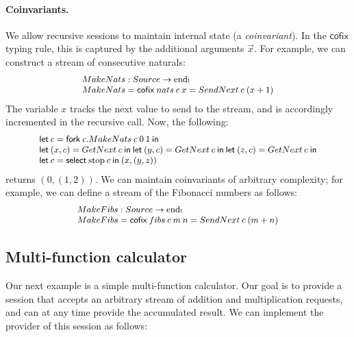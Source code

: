 \documentclass[orivec,envcountsame]{llncs}
\makeatletter
\newcommand{\uto}{\ensuremath{\rightarrow}}
\newcommand{\outterm}{\mathrm{end}_!}
\newcommand{\mkwd}[1]{\mathsf{#1}}
\newcommand{\clabel}[1]{\mathrm{#1}}
\newcommand{\gvselect}[2]{\mkwd{select}\:#1\:#2}
\newcommand{\gvfork}[2]{\mkwd{fork}\:#1.#2}
\newcommand{\lrkwd}{\mkwd{cofix}}
\newcommand{\gvfix}[3]{\lrkwd\:#1\:#2 = #3}
\newcommand{\key}{\mkwd}
\newcommand{\cofix}{\lrkwd}
\newcommand{\ba}{\begin{array}}
\newcommand{\ea}{\end{array}}
\newcommand{\bl}{\ba[t]{@{}l@{}}}
\newcommand{\el}{\ea}
\makeatother
\begin{document}
\paragraph{Coinvariants.}

We allow recursive sessions to maintain internal state (a \emph{coinvariant}). In the $\cofix$
typing rule, this is captured by the additional arguments $\vec{x}$. For example, we can construct a
stream of consecutive naturals:
\[\small
\bl
  MakeNats : Source \uto \outterm \\
  MakeNats = \gvfix{nats}{c\:x}{SendNext\:c\:(x + 1)} \\
\el
\]
The variable $x$ tracks the next value to send to the stream, and is accordingly incremented in the
recursive call. Now, the following:
\[\small
\bl
\key{let}\:c = \gvfork{c}{MakeNats\:c\:0\:1}\:\key{in} \\
\key{let}\:(x, c) = GetNext\:c\:\key{in}\:
\key{let}\:(y, c) = GetNext\:c\:\key{in}\:
\key{let}\:(z, c) = GetNext\:c\:\key{in} \\
\key{let}\:c = \gvselect{\clabel{stop}}{c}\:\key{in}\:(x,(y,z)) \\
\el
\]
returns $(0, (1, 2))$.
%
We can maintain coinvariants of arbitrary complexity; for example, we can define a
stream of the Fibonacci numbers as follows:
\[\small
\bl
  MakeFibs : Source \uto \outterm \\
  MakeFibs = \gvfix{fibs}{c\:m\:n}{SendNext\:c\:(m + n)} \\
\el
\]

\subsection{Multi-function calculator}

Our next example is a simple multi-function calculator. Our goal is to provide a session that
accepts an arbitrary stream of addition and multiplication requests, and can at any time provide the
accumulated result.  We can implement the provider of this session as follows:
\end{document}
